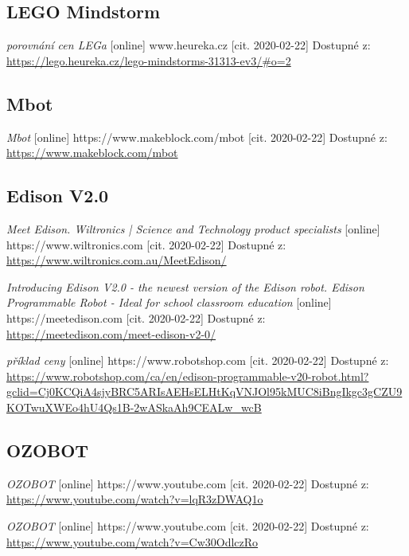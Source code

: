 \documentclass{template/socthesis}
\begin{document}
\begin{thebibliography}{1}
	
	\subsection*{LEGO Mindstorm}	
	\label{LEGO}
	\textit{porovnání cen LEGa} [online] www.heureka.cz [cit. 2020-02-22] Dostupné z: \\ 
	\url{https://lego.heureka.cz/lego-mindstorms-31313-ev3/#o=2}
	
	
	\subsection*{Mbot}	
	\label{Mbot}
	\textit{Mbot} [online] https://www.makeblock.com/mbot [cit. 2020-02-22] Dostupné z: \url{https://www.makeblock.com/mbot}
	
	
	\subsection*{Edison V2.0}
	\label{Edison}
	\textit{Meet Edison. Wiltronics | Science and Technology product specialists} [online] https://www.wiltronics.com [cit. 2020-02-22] Dostupné z: \url{https://www.wiltronics.com.au/MeetEdison/}
	
	\textit{Introducing Edison V2.0 - the newest version of the Edison robot. Edison Programmable Robot - Ideal for school classroom education} [online] https://meetedison.com [cit. 2020-02-22] Dostupné z:
	\url{https://meetedison.com/meet-edison-v2-0/}
	
	\textit{příklad ceny} [online] https://www.robotshop.com [cit. 2020-02-22] Dostupné z: \\ 
	\url{https://www.robotshop.com/ca/en/edison-programmable-v20-robot.html?gclid=Cj0KCQiA4sjyBRC5ARIsAEHsELHtKqVNJOl95kMUC8iBngIkgc3gCZU9KOTwuXWEo4hU4Qs1B-2wASkaAh9CEALw_wcB}
	
	\subsection*{OZOBOT}
	\label{OZOBOT}
	\textit{OZOBOT} [online] https://www.youtube.com [cit. 2020-02-22] Dostupné z:
	\url{https://www.youtube.com/watch?v=lqR3zDWAQ1o}
	
	\textit{OZOBOT} [online] https://www.youtube.com [cit. 2020-02-22] Dostupné z:
	\url{https://www.youtube.com/watch?v=Cw30OdlczRo}
	

\end{thebibliography}
\end{document}
